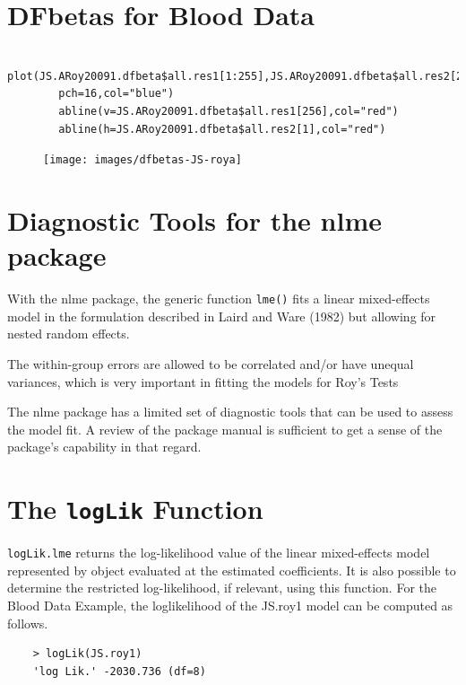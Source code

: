 \documentclass[12pt, a4paper]{report}
\theoremstyle{plain}
\theoremstyle{definition}
\theoremstyle{remark}
\begin{document}
	
	
	\newpage
	
	
	
	
	\section{DFbetas for Blood Data}
	\begin{framed}
		\begin{verbatim}
		plot(JS.ARoy20091.dfbeta$all.res1[1:255],JS.ARoy20091.dfbeta$all.res2[256:510],
		pch=16,col="blue")
		abline(v=JS.ARoy20091.dfbeta$all.res1[256],col="red")
		abline(h=JS.ARoy20091.dfbeta$all.res2[1],col="red")
		\end{verbatim}
	\end{framed}
	\begin{figure}
		\centering
		\texttt{[image: images/dfbetas-JS-roya]}
		\caption{}
		\label{fig:dfbetas-JS-ARoy2009}
	\end{figure}
	

\section{Diagnostic Tools for the nlme package}


With the nlme package, the generic function \texttt{lme()} fits a linear mixed-effects model in the formulation described in Laird and Ware (1982) but allowing for nested random effects. 

The within-group errors are allowed to be correlated and/or have unequal variances, which is very important in fitting the models for Roy's Tests

The nlme package has a limited set of diagnostic tools that can be used to assess the model fit. A review of the package manual is sufficient to get a sense of the package's capability in that regard.




\section{The \texttt{logLik} Function}
\texttt{logLik.lme} returns the log-likelihood value of the linear mixed-effects model represented by object evaluated at the estimated coefficients. It is also possible to determine the restricted log-likelihood, if relevant, using this function. For the Blood Data Example,  the loglikelihood of the JS.roy1 model can be computed as follows.
\begin{framed}
	\begin{verbatim}
	> logLik(JS.roy1)
	'log Lik.' -2030.736 (df=8)
	\end{verbatim}
\end{framed}
\end{document}
